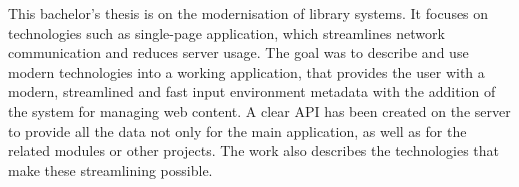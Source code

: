 \documentclass[12pt]{report}
\begin{document}
This bachelor's thesis is on the modernisation of library systems.
It focuses on technologies such as single-page application, which streamlines
network communication and reduces server usage.
The goal was to describe and use modern technologies into a working application,
that provides the user with a modern, streamlined and fast input environment
metadata with the addition of the system for managing web content.
A clear API has been created on the server to provide all the data not only for the
main application, as well as for the related modules or other projects.
The work also describes the technologies that make these
streamlining possible.
\end{document}
